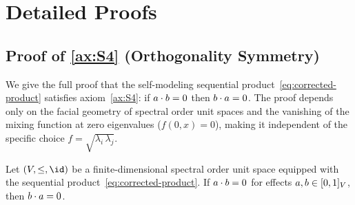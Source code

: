 
\section{Detailed Proofs}\label{app:proofs}

\subsection{Proof of \ref{ax:S4} (Orthogonality Symmetry)}
\label{app:S4-proof}

We give the full proof that the self-modeling sequential
product~\eqref{eq:corrected-product} satisfies axiom~\ref{ax:S4}: if
$\sp{a}{b} = 0$ then $\sp{b}{a} = 0$.  The proof depends only on the
facial geometry of spectral order unit spaces and the vanishing of the
mixing function at zero eigenvalues ($f(0, x) = 0$), making it
independent of the specific choice $f = \sqrt{\lambda_{i}\,
\lambda_{j}}$.

\begin{theorem}\label{thm:S4-full}
Let $(V, \leq, \id)$ be a finite-dimensional spectral order unit
space equipped with the sequential product~\eqref{eq:corrected-product}.
If $\sp{a}{b} = 0$ for effects $a, b \in \eff{V}$, then
$\sp{b}{a} = 0$.
\end{theorem}

